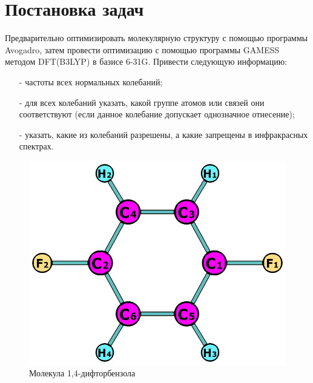 \section{Постановка задач}
Предварительно оптимизировать молекулярную структуру с помощью программы Avogadro, затем провести оптимизацию с помощью программы GAMESS методом DFT(B3LYP) в базисе 6-31G. Привести следующую информацию: 
\begin{itemize}
    \item[-] частоты всех нормальных колебаний;
    \item[-] для всех колебаний указать, какой группе атомов или связей они соответствуют (если данное колебание допускает однозначное отнесение);
    \item[-] указать, какие из колебаний разрешены, а какие запрещены в инфракрасных спектрах.
\end{itemize}

\begin{figure}[H]
\centering
\captionsetup{justification=centering}
\includegraphics[scale=0.4]{fig/0.jpg}
\caption{Молекула 1,4-дифторбензола}
\end{figure}